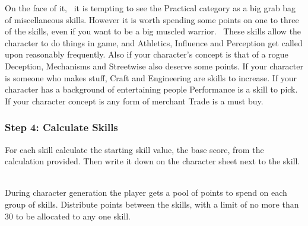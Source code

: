 On the face of it,  it is tempting to see the Practical category as a big grab bag of miscellaneous skills. However it is worth spending some points on one to three of the skills, even if you want to be a big muscled warrior.  These skills allow the character to do things in game, and Athletics, Influence and Perception get called upon reasonably frequently. Also if your character’s concept is that of a rogue Deception, Mechanisms and Streetwise also deserve some points. If your character is someone who makes stuff, Craft and Engineering are skills to increase. If your character has a background of entertaining people Performance is a skill to pick. If your character concept is any form of merchant Trade is a must buy.




\subsubsection{Step 4: Calculate Skills}
For each skill calculate the starting skill value, the base score, from the calculation provided. Then write it down on the character sheet next to the skill.  

During character generation the player gets a pool of points to spend on each group of skills. Distribute points between the skills, with a limit of no more than 30 to be allocated to any one skill.

